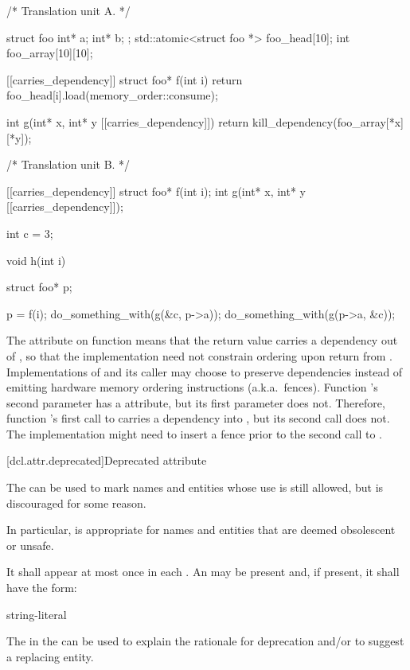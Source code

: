 \pnum
\begin{example}
\begin{codeblock}
/* Translation unit A. */

struct foo { int* a; int* b; };
std::atomic<struct foo *> foo_head[10];
int foo_array[10][10];

[[carries_dependency]] struct foo* f(int i) {
  return foo_head[i].load(memory_order::consume);
}

int g(int* x, int* y [[carries_dependency]]) {
  return kill_dependency(foo_array[*x][*y]);
}

/* Translation unit B. */

[[carries_dependency]] struct foo* f(int i);
int g(int* x, int* y [[carries_dependency]]);

int c = 3;

void h(int i) {
  struct foo* p;

  p = f(i);
  do_something_with(g(&c, p->a));
  do_something_with(g(p->a, &c));
}
\end{codeblock}

The  attribute on function  means that the
return value carries a dependency out of , so that the implementation
need not constrain ordering upon return from . Implementations of
 and its caller may choose to preserve dependencies instead of emitting
hardware memory ordering instructions (a.k.a.\ fences).
Function 's second parameter has a  attribute,
but its first parameter does not. Therefore, function 's first call to
 carries a dependency into , but its second call does not. The
implementation might need to insert a fence prior to the second call to
.
\end{example}
%

[dcl.attr.deprecated]{Deprecated attribute}%

\pnum
The   can be used to mark names and entities
whose use is still allowed, but is discouraged for some reason.
\begin{note}
In particular,
 is appropriate for names and entities that are deemed obsolescent or
unsafe.
\end{note}
It shall appear at most once in each . An
 may be present and, if present, it shall have the form:
\begin{ncbnf}
\terminal{(} string-literal \terminal{)}
\end{ncbnf}
\begin{note}
The  in the 
can be used to explain the rationale for deprecation and/or to suggest a replacing entity.
\end{note}


